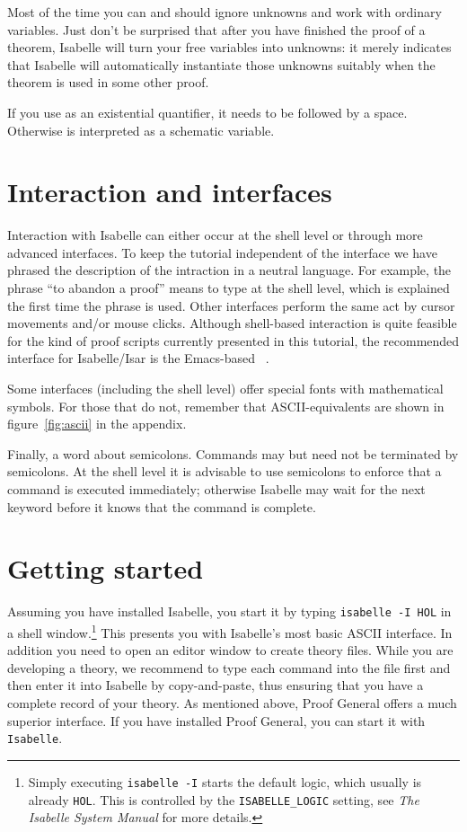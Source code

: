 Most of the time you can and should ignore unknowns and work with ordinary
variables. Just don't be surprised that after you have finished the proof of
a theorem, Isabelle will turn your free variables into unknowns: it merely
indicates that Isabelle will automatically instantiate those unknowns
suitably when the theorem is used in some other proof.
\begin{warn}
  If you use  as an existential
  quantifier, it needs to be followed by a space. Otherwise  is
  interpreted as a schematic variable.
\end{warn}

\section{Interaction and interfaces}

Interaction with Isabelle can either occur at the shell level or through more
advanced interfaces. To keep the tutorial independent of the interface we
have phrased the description of the intraction in a neutral language. For
example, the phrase ``to abandon a proof'' means to type  at the
shell level, which is explained the first time the phrase is used. Other
interfaces perform the same act by cursor movements and/or mouse clicks.
Although shell-based interaction is quite feasible for the kind of proof
scripts currently presented in this tutorial, the recommended interface for
Isabelle/Isar is the Emacs-based ~\cite{Aspinall:TACAS:2000,proofgeneral}.

Some interfaces (including the shell level) offer special fonts with
mathematical symbols. For those that do not, remember that ASCII-equivalents
are shown in figure~\ref{fig:ascii} in the appendix.

Finally, a word about semicolons. 
Commands may but need not be terminated by semicolons.
At the shell level it is advisable to use semicolons to enforce that a command
is executed immediately; otherwise Isabelle may wait for the next keyword
before it knows that the command is complete.


\section{Getting started}

Assuming you have installed Isabelle, you start it by typing \texttt{isabelle
  -I HOL} in a shell window.\footnote{Simply executing \texttt{isabelle -I}
  starts the default logic, which usually is already \texttt{HOL}.  This is
  controlled by the \texttt{ISABELLE_LOGIC} setting, see \emph{The Isabelle
    System Manual} for more details.} This presents you with Isabelle's most
basic ASCII interface.  In addition you need to open an editor window to
create theory files.  While you are developing a theory, we recommend to
type each command into the file first and then enter it into Isabelle by
copy-and-paste, thus ensuring that you have a complete record of your theory.
As mentioned above, Proof General offers a much superior interface.
If you have installed Proof General, you can start it with \texttt{Isabelle}.
